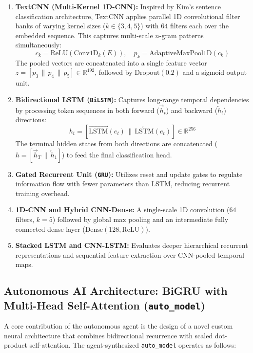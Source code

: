 \documentclass[conference]{IEEEtran}
\begin{document}
\begin{enumerate}
    \item \textbf{TextCNN (Multi-Kernel 1D-CNN):} Inspired by Kim's sentence classification architecture, TextCNN applies parallel 1D convolutional filter banks of varying kernel sizes ($k \in \{3, 4, 5\}$) with $64$ filters each over the embedded sequence. This captures multi-scale $n$-gram patterns simultaneously:
    \begin{equation}
    c_k = \text{ReLU}\left(\text{Conv1D}_k(E)\right), \quad p_k = \text{AdaptiveMaxPool1D}(c_k)
    \end{equation}
    The pooled vectors are concatenated into a single feature vector $z = [p_3 \,\|\, p_4 \,\|\, p_5] \in \mathbb{R}^{192}$, followed by $\text{Dropout}(0.2)$ and a sigmoid output unit.

    \item \textbf{Bidirectional LSTM (\texttt{BiLSTM}):} Captures long-range temporal dependencies by processing token sequences in both forward ($\overrightarrow{h}_t$) and backward ($\overleftarrow{h}_t$) directions:
    \begin{equation}
    h_t = \left[\overrightarrow{\text{LSTM}}(e_t) \,\|\, \overleftarrow{\text{LSTM}}(e_t)\right] \in \mathbb{R}^{256}
    \end{equation}
    The terminal hidden states from both directions are concatenated ($h = [\overrightarrow{h}_T \,\|\, \overleftarrow{h}_1]$) to feed the final classification head.

    \item \textbf{Gated Recurrent Unit (\texttt{GRU}):} Utilizes reset and update gates to regulate information flow with fewer parameters than LSTM, reducing recurrent training overhead.

    \item \textbf{1D-CNN and Hybrid CNN-Dense:} A single-scale 1D convolution ($64$ filters, $k=5$) followed by global max pooling and an intermediate fully connected dense layer ($\text{Dense}(128, \text{ReLU})$).

    \item \textbf{Stacked LSTM and CNN-LSTM:} Evaluates deeper hierarchical recurrent representations and sequential feature extraction over CNN-pooled temporal maps.
\end{enumerate}

\subsection{Autonomous AI Architecture: BiGRU with Multi-Head Self-Attention (\texttt{auto\_model})}
A core contribution of the autonomous agent is the design of a novel custom neural architecture that combines bidirectional recurrence with scaled dot-product self-attention. The agent-synthesized \texttt{auto\_model} operates as follows:
\end{document}
